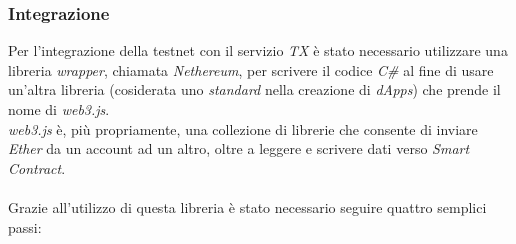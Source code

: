 \documentclass[11pt]{thesistemp}
\begin{document}
\subsubsection{Integrazione}

Per l'integrazione della testnet con il servizio \textit{TX} è stato necessario utilizzare una libreria \textit{wrapper}, chiamata \textit{Nethereum}, per scrivere il codice \textit{C\#} al fine di usare un'altra libreria (cosiderata uno \textit{standard} nella creazione di \textit{dApps}) che prende il nome di \textit{web3.js}.\\
\textit{web3.js} è, più propriamente, una collezione di librerie che consente di inviare \textit{Ether} da un account ad un altro, oltre a leggere e scrivere dati verso \textit{Smart Contract}.\\\\
Grazie all'utilizzo di questa libreria è stato necessario seguire quattro semplici passi:
\end{document}
